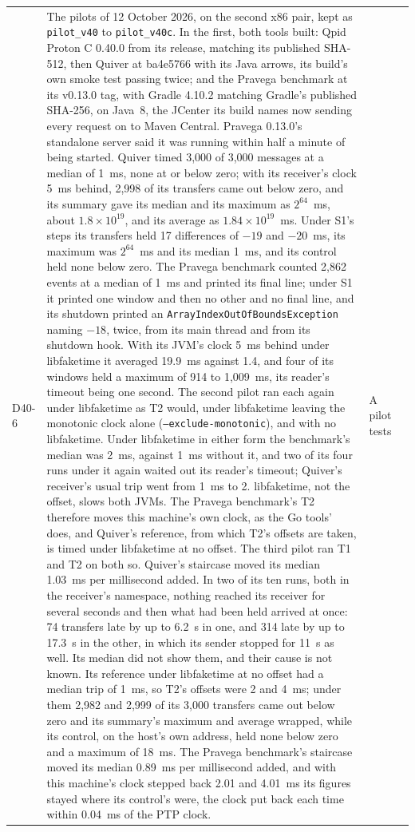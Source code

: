 \documentclass[11pt]{article}
\begin{document}
{\begin{longtable}{@{}p{1.1cm} >{\raggedright\arraybackslash}p{6.1cm} >{\raggedright\arraybackslash}p{6.0cm} >{\raggedright\arraybackslash}p{2.2cm}@{}}
D40-6 & The pilots of 12 October 2026, on the second x86 pair, kept as \texttt{pilot\_v40} to \texttt{pilot\_v40c}. In the first, both tools built: Qpid Proton C 0.40.0 from its release, matching its published SHA-512, then Quiver at ba4e5766 with its Java arrows, its build's own smoke test passing twice; and the Pravega benchmark at its v0.13.0 tag, with Gradle 4.10.2 matching Gradle's published SHA-256, on Java~8, the JCenter its build names now sending every request on to Maven Central. Pravega 0.13.0's standalone server said it was running within half a minute of being started. Quiver timed 3,000 of 3,000 messages at a median of 1~ms, none at or below zero; with its receiver's clock 5~ms behind, 2,998 of its transfers came out below zero, and its summary gave its median and its maximum as $2^{64}$~ms, about $1.8\times10^{19}$, and its average as $1.84\times10^{19}$~ms. Under S1's steps its transfers held 17 differences of $-19$ and $-20$~ms, its maximum was $2^{64}$~ms and its median 1~ms, and its control held none below zero. The Pravega benchmark counted 2,862 events at a median of 1~ms and printed its final line; under S1 it printed one window and then no other and no final line, and its shutdown printed an \texttt{ArrayIndexOutOfBoundsException} naming $-18$, twice, from its main thread and from its shutdown hook. With its JVM's clock 5~ms behind under libfaketime it averaged 19.9~ms against 1.4, and four of its windows held a maximum of 914 to 1,009~ms, its reader's timeout being one second. The second pilot ran each again under libfaketime as T2 would, under libfaketime leaving the monotonic clock alone (\texttt{--exclude-monotonic}), and with no libfaketime. Under libfaketime in either form the benchmark's median was 2~ms, against 1~ms without it, and two of its four runs under it again waited out its reader's timeout; Quiver's receiver's usual trip went from 1~ms to 2. libfaketime, not the offset, slows both JVMs. The Pravega benchmark's T2 therefore moves this machine's own clock, as the Go tools' does, and Quiver's reference, from which T2's offsets are taken, is timed under libfaketime at no offset. The third pilot ran T1 and T2 on both so. Quiver's staircase moved its median 1.03~ms per millisecond added. In two of its ten runs, both in the receiver's namespace, nothing reached its receiver for several seconds and then what had been held arrived at once: 74 transfers late by up to 6.2~s in one, and 314 late by up to 17.3~s in the other, in which its sender stopped for 11~s as well. Its median did not show them, and their cause is not known. Its reference under libfaketime at no offset had a median trip of 1~ms, so T2's offsets were 2 and 4~ms; under them 2,982 and 2,999 of its 3,000 transfers came out below zero and its summary's maximum and average wrapped, while its control, on the host's own address, held none below zero and a maximum of 18~ms. The Pravega benchmark's staircase moved its median 0.89~ms per millisecond added, and with this machine's clock stepped back 2.01 and 4.01~ms its figures stayed where its control's were, the clock put back each time within 0.04~ms of the PTP clock. & A pilot tests 
\end{longtable}}
\end{document}
